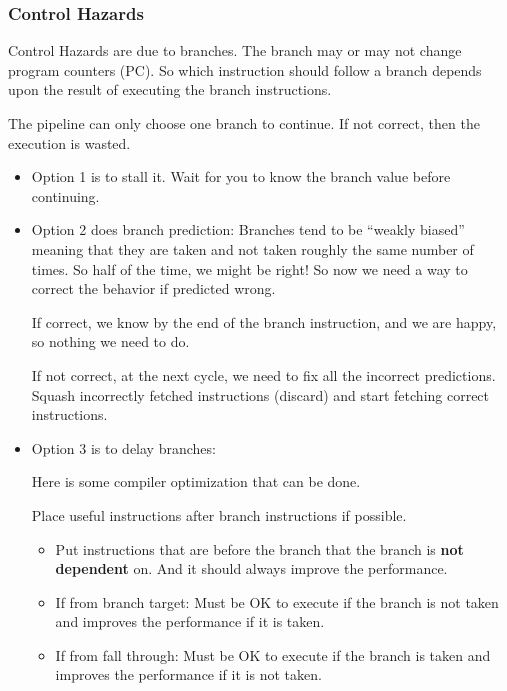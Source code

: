 \documentclass[letterpaper,12pt]{article}
\begin{document}
\subsubsection{Control Hazards}

Control Hazards are due to branches. The branch may or may not change program counters (PC). So which instruction should follow a branch depends upon the result of executing the branch instructions.

The pipeline can only choose one branch to continue. If not correct, then the execution is wasted.

\begin{itemize}
    \item Option 1 is to stall it. Wait for you to know the branch value before continuing.
    \item Option 2 does branch prediction:
          Branches tend to be ``weakly biased'' meaning that they are taken and not taken roughly the same number of times. So half of the time, we might be right! So now we need a way to correct the behavior if predicted wrong.

          If correct, we know by the end of the branch instruction, and we are happy, so nothing we need to do.

          If not correct, at the next cycle, we need to fix all the incorrect predictions. Squash incorrectly fetched instructions (discard) and start fetching correct instructions.

    \item Option 3 is to delay branches:

          Here is some compiler optimization that can be done.

          Place useful instructions after branch instructions if possible.

          \begin{itemize}
              \item Put instructions that are before the branch that the branch is \textbf{not dependent} on. And it should always improve the performance.
              \item If from branch target: Must be OK to execute if the branch is not taken and improves the performance if it is taken.
              \item If from fall through: Must be OK to execute if the branch is taken and improves the performance if it is not taken.
          \end{itemize}
\end{itemize}
\end{document}
